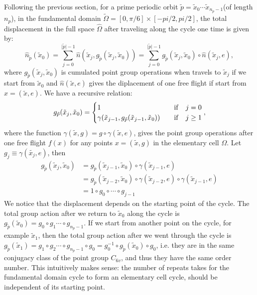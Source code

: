 \begin{description}
Following the previous section, for a prime periodic orbit $\tilde{p}=\tilde{x}_{0}\cdots\tilde{x}_{n_{p}-1}$(of
length $n_{p}$), in the fundamental domain $\tilde{\Omega}=[0,\pi/6]\times[-pi/2,pi/2]$,
the total displacement in the full space $\hat{\Omega}$ after traveling
along the cycle one time is given by:
\[
\hat{n}_{\tilde{p}}(\tilde{x}_{0})=\sum_{j=0}^{\vert\tilde{p}\vert-1}\hat{n}(\tilde{x}_{j},g_{\tilde{p}}(\tilde{x}_{j},\tilde{x}_{0}))=\sum_{j=0}^{\vert\tilde{p}\vert-1}g_{\tilde{p}}(\tilde{x}_{j},\tilde{x}_{0})\circ\hat{n}(\tilde{x}_{j},e),
\]
where $g_{\tilde{p}}(\tilde{x}_{j},\tilde{x}_{0})$ is cumulated point
group operations when travels to $\tilde{x}_{j}$ if we start from
$\tilde{x}_{0}$ and $\hat{n}(\tilde{x},e)$ gives the diplacement
of one free flight if start from$x=(\tilde{x},e)$. We have a recursive
relation:
\[
g_{\tilde{p}}(\tilde{x}_{j},\tilde{x}_{0})=\begin{cases}
1 & {\rm \quad if\quad}j=0\\
\gamma(\tilde{x}_{j-1},g_{\tilde{p}}(\tilde{x}_{j-1},\tilde{x}_{0})) & {\rm \quad if\quad}j\geq1
\end{cases},
\]
where the function $\gamma(\tilde{x},g)=g\circ\gamma(\tilde{x},e)$,
gives the point group operations after one free flight $f(x)$ for
any points $x=(\tilde{x},g)$ in the elementary cell $\Omega$. Let
$g_{j}\equiv\gamma(\tilde{x_{j}},e)$, then
\begin{align*}
g_{\tilde{p}}(\tilde{x}_{j},\tilde{x}_{0}) & =g_{\tilde{p}}(\tilde{x}_{j-1},\tilde{x}_{0})\circ\gamma(\tilde{x}_{j-1},e)\\
 & =g_{\tilde{p}}(\tilde{x}_{j-2},\tilde{x}_{0})\circ\gamma(\tilde{x}_{j-2},e)\circ\gamma(\tilde{x}_{j-1},e)\\
 & =1\circ g_{0}\circ\cdots\circ g_{j-1}
\end{align*}
We notice that the displacement depends on the starting point of the
cycle. The total group action after we return to $\tilde{x}_{0}$
along the cycle is $g_{\tilde{p}}(\tilde{x}_{0})=g_{0}\circ g_{1}\cdots\circ g_{n_{p}-1}$.
If we start from another point on the cycle, for example $\tilde{x}_{1}$,
then the total group action after we went through the cycle is $g_{\tilde{p}}(\tilde{x}_{1})=g_{1}\circ g_{2}\cdots\circ g_{n_{p}-1}\circ g_{0}=g_{0}^{-1}\circ g_{\tilde{p}}(\tilde{x}_{0})\circ g_{0}$,
i.e. they are in the same conjugacy class of the point group $C_{6v}$,
and thus they have the same order number. This intuitively makes sense:
the number of repeats takes for the fundamental domain cycle to form
an elementary cell cycle, should be independent of its starting point.


\end{description}
